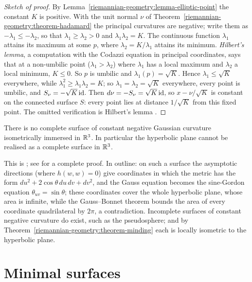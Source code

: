 \begin{proof}[Sketch of proof]
By Lemma~\ref{riemannian-geometry:lemma-elliptic-point} the constant $K$ is positive. With the unit normal $\nu$ of Theorem~\ref{riemannian-geometry:theorem-hadamard} the
principal curvatures are negative; write them as $-\lambda_1 \leq -\lambda_2$, so that $\lambda_1 \geq \lambda_2 > 0$ and $\lambda_1\lambda_2 = K$. The continuous function $\lambda_1$
attains its maximum at some $p$, where $\lambda_2 = K/\lambda_1$ attains its minimum. \emph{Hilbert's lemma}, a computation with the Codazzi equation in principal coordinates, says
that at a non-umbilic point ($\lambda_1 > \lambda_2$) where $\lambda_1$ has a local maximum and $\lambda_2$ a local minimum, $K \leq 0$. So $p$ is umbilic and
$\lambda_1(p) = \sqrt K$. Hence $\lambda_1 \leq \sqrt K$ everywhere, while $\lambda_1^2 \geq \lambda_1\lambda_2 = K$; so $\lambda_1 = \lambda_2 = \sqrt K$ everywhere, every point is umbilic,
and $S_\nu = -\sqrt K\,\mathrm{id}$. Then $d\nu = -S_\nu = \sqrt K\,\mathrm{id}$, so $x - \nu/\sqrt K$ is constant on the connected surface $S$: every point lies at distance $1/\sqrt K$ from this
fixed point. The omitted verification is Hilbert's lemma \cite[Chapter 5]{do-carmo-curves-surfaces}.
\end{proof}

\begin{theorem}[Hilbert]\label{riemannian-geometry:theorem-hilbert}
There is no complete surface of constant negative Gaussian curvature isometrically immersed in $\mathbb{R}^3$. In particular the hyperbolic plane cannot be realised as a complete
surface in $\mathbb{R}^3$.
\end{theorem}

This is \cite{hilbert-1901}; see \cite[Chapter 5]{do-carmo-curves-surfaces} for a complete proof. In outline: on such a surface the asymptotic directions (where $h(w, w) = 0$) give
coordinates in which the metric has the form $du^2 + 2\cos\theta\,du\,dv + dv^2$, and the Gauss equation becomes the sine-Gordon equation $\theta_{uv} = \sin\theta$; these
coordinates cover the whole hyperbolic plane, whose area is infinite, while the Gauss--Bonnet theorem bounds the area of every coordinate quadrilateral by $2\pi$, a contradiction.
Incomplete surfaces of constant negative curvature do exist, such as the pseudosphere; and by Theorem~\ref{riemannian-geometry:theorem-minding} each is locally isometric to
the hyperbolic plane.

\section{Minimal surfaces}\label{riemannian-geometry:section-minimal}

